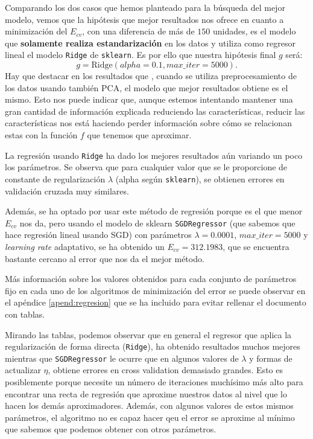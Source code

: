 \documentclass[a4paper, 20pt]{article}
\begin{document}
Comparando los dos casos que hemos planteado para la búsqueda del mejor modelo, vemos que la hipótesis que mejor resultados nos ofrece en cuanto a minimización del $E_{cv}$, con una diferencia de más de $150$ unidades, es el modelo que \textbf{solamente realiza estandarización} en los datos y utiliza como regresor lineal el modelo \lstinline{Ridge} de \lstinline{sklearn}. Es por ello que nuestra hipótesis final $g$ será:
$$
g = \text{Ridge}(alpha = 0.1, max\_iter = 5000).
$$
Hay que destacar en los resultados que , cuando se utiliza preprocesamiento de los datos usando también PCA, el modelo que mejor resultados obtiene es el mismo. Esto nos puede indicar que, aunque estemos intentando mantener una gran cantidad de información explicada reduciendo las características, reducir las características nos está haciendo perder información sobre cómo se relacionan estas con la función $f$ que tenemos que aproximar.

La regresión usando \lstinline{Ridge} ha dado los mejores resultados aún variando un poco los parámetros. Se observa que para cualquier valor que se le proporcione de constante de regularización $\lambda$ (alpha según \lstinline{sklearn}), se obtienen errores en validación cruzada muy similares.

Además, se ha optado por usar este método de regresión porque es el que menor $E_{cv}$ nos da, pero usando el modelo de sklearn \lstinline{SGDRegressor} (que sabemos que hace regresión lineal usando SGD) con parámetros $\lambda = 0.0001$, $max\_iter = 5000$ y \emph{learning rate} adaptativo, se ha obtenido un $E_{cv} = 312.1983$, que se encuentra bastante cercano al error que nos da el mejor método.

Más información sobre los valores obtenidos para cada conjunto de parámetros fijo en cada uno de los algoritmos de minimización del error se puede observar en el apéndice \ref{apend:regresion} que se ha incluido para evitar rellenar el documento con tablas.

Mirando las tablas, podemos observar que en general el regresor que aplica la regularización de forma directa (\lstinline{Ridge}), ha obtenido resultados muchos mejores mientras que \lstinline{SGDRegressor} le ocurre que en algunos valores de $\lambda$ y formas de actualizar $\eta$, obtiene errores en cross validation demasiado grandes. Esto es posiblemente porque necesite un número de iteraciones muchísimo más alto para encontrar una recta de regresión que aproxime nuestros datos al nivel que lo hacen los demás aproximadores. Además, con algunos valores de estos mismos parámetros, el algoritmo no es capaz hacer qeu el error se aproxime al mínimo que sabemos que podemos obtener con otros parámetros.
\end{document}

